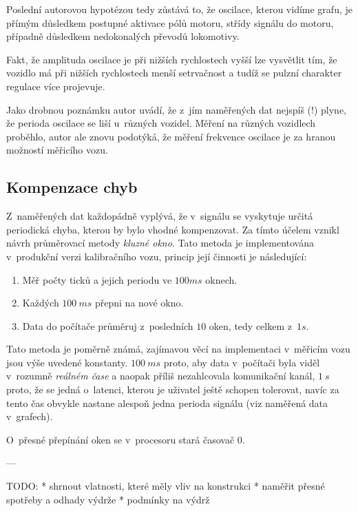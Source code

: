 \begin{enumerate}
Poslední autorovou hypotézou tedy zůstává to, že oscilace, kterou vidíme grafu,
je přímým důsledkem postupné aktivace pólů motoru, střídy signálu do motoru,
případně důsledkem nedokonalých převodů lokomotivy.

Fakt, že amplituda oscilace je při nižších rychlostech vyšší lze vysvětlit tím,
že vozidlo má při nižších rychlostech menší setrvačnost a tudíž se pulzní
charakter regulace více projevuje.

Jako drobnou poznámku autor uvádí, že z~jím naměřených dat nejspíš (!) plyne,
že perioda oscilace se liší u~různých vozidel. Měření na různých vozidlech
proběhlo, autor ale znovu podotýká, že měření frekvence oscilace je za hranou
možností měřicího vozu.

\end{enumerate}

\subsection{Kompenzace chyb}
\label{subsec:wsm-kompenzace}

Z~naměřených dat každopádně vyplývá, že v~signálu se vyskytuje určitá
periodická chyba, kterou by bylo vhodné kompenzovat. Za tímto účelem vznikl
návrh průměrovací metody \textit{kluzné okno}. Tato metoda je implementována
v~produkční verzi kalibračního vozu, princip její činnosti je následující:

\begin{enumerate}
\item Měř počty ticků a jejich periodu ve $100ms$ oknech.
\item Každých $100\ ms$ přepni na nové okno.
\item Data do počítače průměruj z~posledních $10$ oken, tedy celkem z~$1 s$.
\end{enumerate}

Tato metoda je poměrně známá, zajímavou věcí na implementaci v~měřicím vozu
jsou výše uvedené konstanty. $100\ ms$ proto, aby data v~počítači byla viděl
v~rozumně \textit{reálném čase} a naopak příliš nezahlcovala komunikační kanál,
$1\ s$ proto, že se jedná o~latenci, kterou je uživatel ještě schopen tolerovat,
navíc za tento čas obvykle nastane alespoň jedna perioda signálu (viz naměřená
data v~grafech).

O~přesné přepínání oken se v~procesoru stará časovač 0.

---

TODO:
 * shrnout vlatnosti, které měly vliv na konstrukci
 * naměřit přesné spotřeby a odhady výdrže
 * podmínky na výdrž
